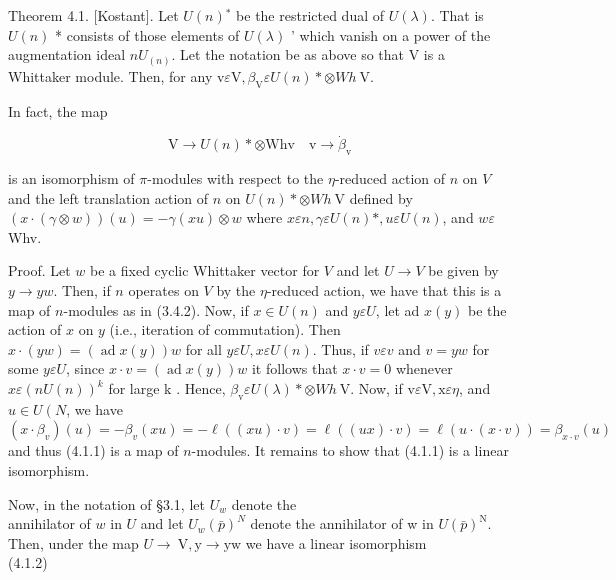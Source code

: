 \documentclass[10pt]{article}
\begin{document}
Theorem 4.1. [Kostant]. Let $U(n){ }^{*}$ be the restricted dual of $U(\lambda)$. That is $U(n)$ * consists of those elements of $U(\lambda)$ ' which vanish on a power of the augmentation ideal $n U_{(n)}$. Let the notation be as above so that V is a Whittaker module. Then, for any $\mathrm{v} \varepsilon \mathrm{V}, \beta_{\mathrm{V}} \varepsilon U(n) * \otimes W h \mathrm{~V}$.

In fact, the map


\begin{equation*}
\mathrm{V} \rightarrow U(n) * \otimes \mathrm{Whv} \quad \mathrm{v} \rightarrow \dot{\beta}_{\mathrm{v}} \tag{4.1.1}
\end{equation*}


is an isomorphism of $\pi$-modules with respect to the $\eta$-reduced action of $n$ on $V$ and the left translation action of $n$ on $U(n) * \otimes W h \mathrm{~V}$ defined by $(x \cdot(\gamma \otimes w))(u)=-\gamma(x u) \otimes w$ where $x \varepsilon n, \gamma \varepsilon U(n) *, u \varepsilon U(n)$, and $w \varepsilon$ Whv.

Proof. Let $w$ be a fixed cyclic Whittaker vector for $V$ and let $U \rightarrow V$ be given by $y \rightarrow y w$. Then, if $n$ operates on $V$ by the $\eta$-reduced action, we have that this is a map of $n$-modules as in (3.4.2). Now, if $x \in U(n)$ and $y \varepsilon U$, let ad $x(y)$ be the action of $x$ on $y$ (i.e., iteration of commutation). Then $x \cdot(y w)=(\operatorname{ad} x(y)) w$ for all $y \varepsilon U, x \varepsilon U(n)$. Thus, if $v \varepsilon v$ and $v=y w$ for some $y \varepsilon U$, since $x \cdot v=(\operatorname{ad} x(y)) w$ it follows that $x \cdot v=0$ whenever $x \varepsilon(n U(n))^{k}$ for large k . Hence, $\beta_{\mathrm{v}} \varepsilon U(\lambda) * \otimes W h \mathrm{~V}$. Now, if $\mathrm{v} \varepsilon \mathrm{V}, \mathrm{x} \varepsilon \eta$, and $u \in U\left(N\right.$, we have $\left(x \cdot \beta_{v}\right)(u)=-\beta_{v}(x u)=-\ell((x u) \cdot v)= \ell((u x) \cdot v)=\ell(u \cdot(x \cdot v))=\beta_{x \cdot v}(u)$ and thus (4.1.1) is a map of $n$-modules. It remains to show that (4.1.1) is a linear isomorphism.

Now, in the notation of §3.1, let $U_{w}$ denote the\\
annihilator of $w$ in $U$ and let $U_{w}(\bar{p})^{N}$ denote the annihilator of w in $U(\bar{p})^{\mathrm{N}}$. Then, under the map $U \rightarrow \mathrm{~V}, \mathrm{y} \rightarrow \mathrm{yw}$ we have a linear isomorphism\\
(4.1.2)
\end{document}
